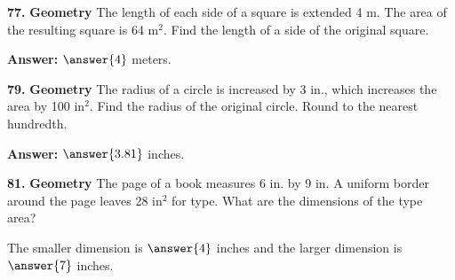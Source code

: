 \documentclass{ximera}
\begin{document}
\begin{problem}
\textbf{77.} \textbf{Geometry} The length of each side of a square is extended 4 m. The area of
  the resulting square is 64 m$^2$. Find the length of a side of the original square.

\textbf{Answer:} $\answer{4}$ meters.
\end{problem}

\begin{problem}
\textbf{79.} \textbf{Geometry} The radius of a circle is increased by 3 in., which increases the
  area by 100 in$^2$. Find the radius of the original circle. Round to the nearest
  hundredth.

\textbf{Answer:} $\answer{3.81}$ inches.
\end{problem}

\begin{problem}
\textbf{81.} \textbf{Geometry} The page of a book measures 6 in. by 9 in. A uniform border
  around the page leaves 28 in$^2$ for type. What are the dimensions of the type area?

The smaller dimension is $\answer{4}$ inches and the larger dimension is $\answer{7}$ inches.
\end{problem}
\end{document}
